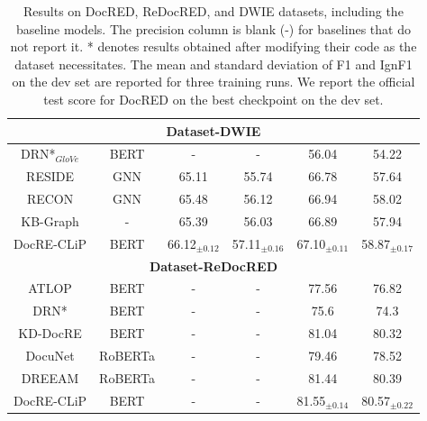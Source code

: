 \documentclass[letterpaper]{article} %
\begin{document}
\begin{table}[ht]
{\begin{tabular}{cccccc}
\hline





\multicolumn{6}{c}{\textbf{Dataset-DWIE}}  \\
\hline
DRN*$_{GloVe}$ & BERT  & - & -  & 56.04  & 54.22 \\


RESIDE & GNN & 65.11& 55.74 & 66.78& 57.64 \\

RECON  & GNN & 65.48& 56.12 & 66.94& 58.02\\

KB-Graph & - & 65.39 & 56.03 & 66.89 &  57.94\\

 {DocRE-CLiP} & BERT &{66.12$_{\pm 0.12}$} & {57.11$_{\pm 0.16}$} & {67.10$_{\pm 0.11}$} & {58.87$_{\pm 0.17}$} \\


\hline
\multicolumn{6}{c}{\textbf{Dataset-ReDocRED}}  \\
\hline

  ATLOP  &  BERT &- & - & 77.56 &  76.82 \\
DRN*  &  BERT & - & - & 75.6 & 74.3 \\


KD-DocRE & BERT &- & - & 81.04 &  80.32\\

DocuNet  & RoBERTa & - & - & 79.46 &  78.52 \\

 DREEAM & RoBERTa &- & - & 81.44 &  80.39\\



 {DocRE-CLiP} & BERT & - & - & {81.55$_{\pm 0.14}$} & {80.57$_{\pm 0.22}$} \\
 
\hline

\end{tabular}
}
\caption{{Results on DocRED, ReDocRED, and DWIE datasets, including the baseline models. The precision column is blank (-) for baselines that do not report it. * denotes results obtained after modifying their code as the dataset necessitates. The mean and standard deviation of F1 and IgnF1 on the dev set are reported for three training runs. We report the official test score for DocRED on the best checkpoint on the dev set.
}}
    \label{results}   
\end{table}
\end{document}
